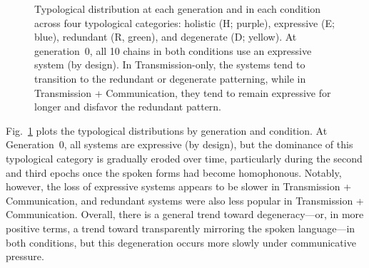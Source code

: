 \documentclass[doc,biblatex]{apa7}
\begin{document}
	\begin{figure}
	\vspace*{2pt}
	\caption{Typological distribution at each generation and in each condition across four typological categories: holistic (H; purple), expressive (E; blue), redundant (R, green), and degenerate (D; yellow). At generation~0, all 10 chains in both conditions use an expressive system (by design). In Transmission-only, the systems tend to transition to the redundant or degenerate patterning, while in Transmission + Communication, they tend to remain expressive for longer and disfavor the redundant pattern.}
	\label{typ_dist_con}
	\end{figure}

Fig.~\ref{typ_dist_con} plots the typological distributions by generation and condition. At Generation~0, all systems are expressive (by design), but the dominance of this typological category is gradually eroded over time, particularly during the second and third epochs once the spoken forms had become homophonous. Notably, however, the loss of expressive systems appears to be slower in Transmission + Communication, and redundant systems were also less popular in Transmission + Communication. Overall, there is a general trend toward degeneracy---or, in more positive terms, a trend toward transparently mirroring the spoken language---in both conditions, but this degeneration occurs more slowly under communicative pressure.
\end{document}
